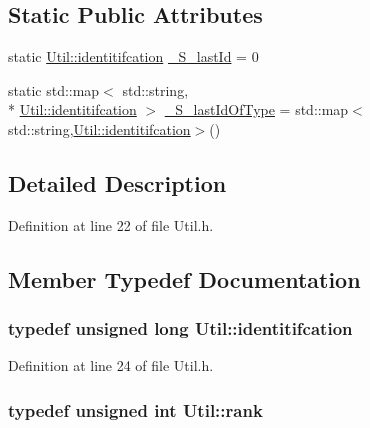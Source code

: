 \subsection*{Static Public Attributes}
\begin{DoxyCompactItemize}
\item 
static \hyperlink{class_util_ad17d458d9344b10bba64347e514d6d71}{Util\-::identitifcation} \hyperlink{class_util_afe2f6d8c09ef1108299a4dc8ec59b133}{\-\_\-\-S\-\_\-last\-Id} = 0
\item 
static std\-::map$<$ std\-::string, \\*
\hyperlink{class_util_ad17d458d9344b10bba64347e514d6d71}{Util\-::identitifcation} $>$ \hyperlink{class_util_a06a8897362f4bd17c68d59557083fc56}{\-\_\-\-S\-\_\-last\-Id\-Of\-Type} = std\-::map$<$std\-::string,\hyperlink{class_util_ad17d458d9344b10bba64347e514d6d71}{Util\-::identitifcation}$>$()
\end{DoxyCompactItemize}


\subsection{Detailed Description}


Definition at line 22 of file Util.\-h.



\subsection{Member Typedef Documentation}
\hypertarget{class_util_ad17d458d9344b10bba64347e514d6d71}{
\subsubsection[{identitifcation}]{\setlength{\rightskip}{0pt plus 5cm}typedef unsigned long {\bf Util\-::identitifcation}}}\label{class_util_ad17d458d9344b10bba64347e514d6d71}


Definition at line 24 of file Util.\-h.

\hypertarget{class_util_a2a402b3a3a889d699bb3a1a87cbe6d1e}{
\subsubsection[{rank}]{\setlength{\rightskip}{0pt plus 5cm}typedef unsigned int {\bf Util\-::rank}}}\label{class_util_a2a402b3a3a889d699bb3a1a87cbe6d1e}


